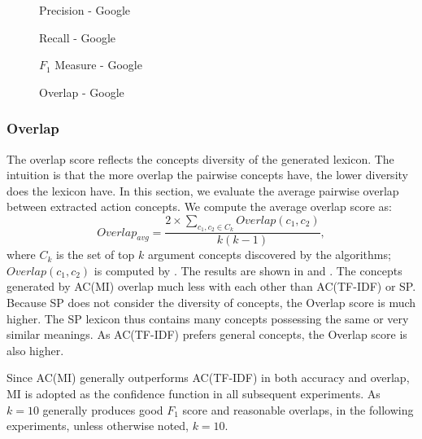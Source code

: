 \begin{figure*}[th]
\begin{minipage}[t]{0.5\columnwidth}
\centering
{}
\caption{Precision - Google}
\label{fig:precision_ngram}
\end{minipage}
\begin{minipage}[t]{0.5\columnwidth}
\centering
{}
\caption{Recall - Google}
\label{fig:recall_ngram}
\end{minipage}
\begin{minipage}[t]{0.5\columnwidth}
\centering
{}
\caption{$F_1$ Measure - Google}
\label{fig:f1_ngram}
\end{minipage}
\begin{minipage}[t]{0.5\columnwidth}
\centering
{}
\caption{Overlap - Google}
\label{fig:overlap_ngram}
\end{minipage}
\end{figure*}

\subsubsection{Overlap}
The overlap score reflects the concepts diversity of the generated lexicon.
The intuition is that the more overlap the pairwise concepts have,
the lower diversity does the lexicon have.
In this section, we evaluate the average pairwise overlap between
extracted action concepts.
We compute the average overlap score as:
\[
Overlap_{avg} = \frac{2\times \sum_{c_1,c_2\in C_k}{Overlap(c_1,c_2)}}{k(k-1)},
\]
where $C_k$ is the set of top $k$ argument concepts discovered by
the algorithms; $Overlap(c_1,c_2)$ is computed by .
The results are shown in   and
.
The concepts generated by AC(MI) overlap much less with each other than
AC(TF-IDF) or SP. Because SP does not consider the diversity of concepts,
the Overlap score is much higher. The SP lexicon thus contains many concepts
possessing the same or very similar meanings.
As AC(TF-IDF) prefers general concepts, the Overlap score is also
higher.

Since AC(MI) generally outperforms AC(TF-IDF) in both accuracy and
overlap, MI is adopted as the confidence function in all subsequent experiments.
As $k=10$ generally produces good $F_1$ score and reasonable overlaps, in the
following experiments, unless otherwise noted, $k=10$.
